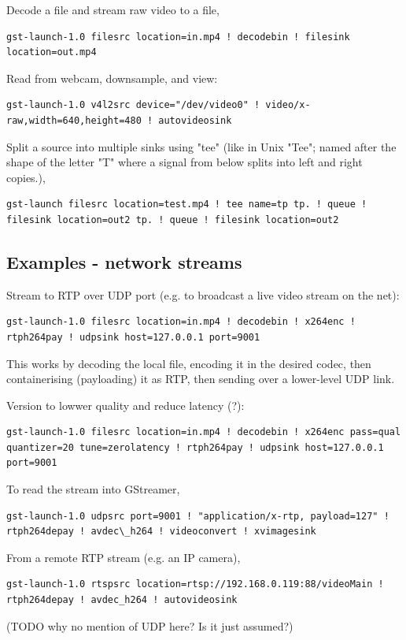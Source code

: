 \documentclass[oneside,english]{scrbook}
\begin{document}
Decode a file and stream raw video to a file, 
\begin{lstlisting}
gst-launch-1.0 filesrc location=in.mp4 ! decodebin ! filesink location=out.mp4
\end{lstlisting}

Read from webcam, downsample, and view:
\begin{lstlisting}
gst-launch-1.0 v4l2src device="/dev/video0" ! video/x-raw,width=640,height=480 ! autovideosink
\end{lstlisting}

Split a source into multiple sinks using "tee" (like in Unix "Tee"; named after the shape of the letter "T" where a signal from below splits into left and right copies.),

\begin{lstlisting}
gst-launch filesrc location=test.mp4 ! tee name=tp tp. ! queue ! filesink location=out2 tp. ! queue ! filesink location=out2
\end{lstlisting}

\subsection{Examples - network streams}

Stream to RTP over UDP port (e.g. to broadcast a live video stream on the net):
\begin{lstlisting}
gst-launch-1.0 filesrc location=in.mp4 ! decodebin ! x264enc ! rtph264pay ! udpsink host=127.0.0.1 port=9001
\end{lstlisting}
This works by decoding the local file, encoding it in the desired codec, then containerising (payloading) it as RTP, then sending over a lower-level UDP link.

Version to lowwer quality and reduce latency (?):
\begin{lstlisting}
gst-launch-1.0 filesrc location=in.mp4 ! decodebin ! x264enc pass=qual quantizer=20 tune=zerolatency ! rtph264pay ! udpsink host=127.0.0.1 port=9001
\end{lstlisting}

To read the stream into GStreamer,
\begin{lstlisting}
gst-launch-1.0 udpsrc port=9001 ! "application/x-rtp, payload=127" ! rtph264depay ! avdec\_h264 ! videoconvert ! xvimagesink
\end{lstlisting}

From a remote RTP stream (e.g. an IP camera),
\begin{lstlisting}
gst-launch-1.0 rtspsrc location=rtsp://192.168.0.119:88/videoMain !  rtph264depay ! avdec_h264 ! autovideosink
\end{lstlisting}
(TODO why no mention of UDP here? Is it just assumed?)
\end{document}
